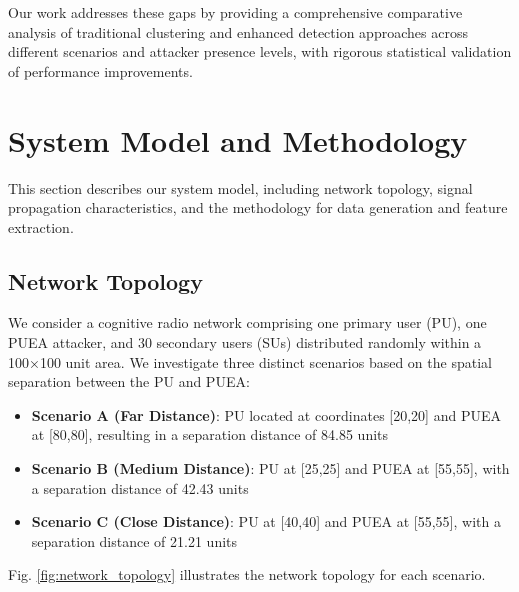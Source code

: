 \documentclass[conference]{IEEEtran}
\begin{document}
Our work addresses these gaps by providing a comprehensive comparative analysis of traditional clustering and enhanced detection approaches across different scenarios and attacker presence levels, with rigorous statistical validation of performance improvements.

\section{System Model and Methodology}
\label{sec:system_model}

This section describes our system model, including network topology, signal propagation characteristics, and the methodology for data generation and feature extraction.

\subsection{Network Topology}

We consider a cognitive radio network comprising one primary user (PU), one PUEA attacker, and 30 secondary users (SUs) distributed randomly within a 100×100 unit area. We investigate three distinct scenarios based on the spatial separation between the PU and PUEA:

\begin{itemize}
    \item \textbf{Scenario A (Far Distance)}: PU located at coordinates [20,20] and PUEA at [80,80], resulting in a separation distance of 84.85 units
    \item \textbf{Scenario B (Medium Distance)}: PU at [25,25] and PUEA at [55,55], with a separation distance of 42.43 units
    \item \textbf{Scenario C (Close Distance)}: PU at [40,40] and PUEA at [55,55], with a separation distance of 21.21 units
\end{itemize}

Fig. \ref{fig:network_topology} illustrates the network topology for each scenario.
\end{document}
